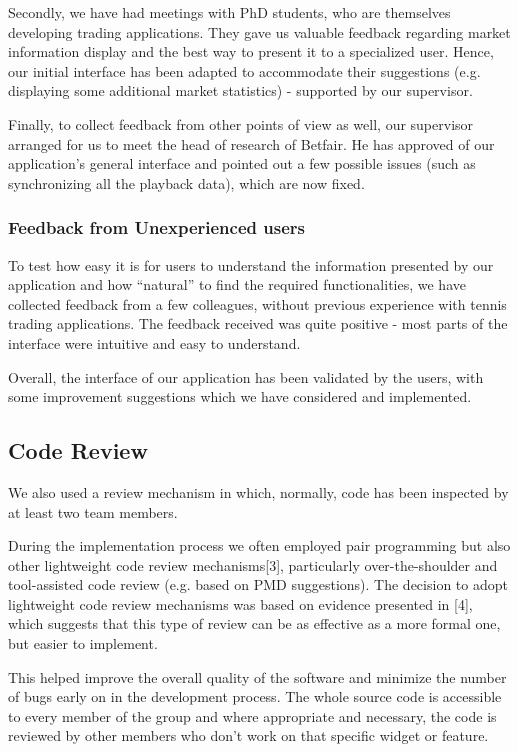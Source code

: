 \documentclass[10pt]{article}
\begin{document}
Secondly, we have had meetings with PhD students, who are themselves developing trading applications. They gave us valuable feedback regarding market information display and the best way to present it to a specialized user. Hence, our initial interface has been adapted to accommodate their suggestions (e.g. displaying some additional market statistics) - supported by our supervisor.

Finally, to collect feedback from other points of view as well, our supervisor arranged for us to meet the head of research of Betfair. He has approved of our application's general interface and pointed out a few possible issues (such as synchronizing all the playback data), which are now fixed.

\subsubsection{Feedback from Unexperienced users}

To test how easy it is for users to understand the information presented by our application and how ``natural'' to find the required functionalities, we have collected feedback from a few colleagues, without previous experience with tennis trading applications. The feedback received was quite positive - most parts of the interface were intuitive and easy to understand.

Overall, the interface of our application has been validated by the users, with some improvement suggestions which we have considered and implemented.


\subsection{Code Review}

We also used a review mechanism in which, normally, code has been inspected by at least two team members.

During the implementation process we often employed pair programming but also other lightweight code review mechanisms[3], particularly over-the-shoulder and tool-assisted code review (e.g. based on PMD suggestions).
The decision to adopt lightweight code review mechanisms was based on evidence presented in [4], which suggests that this type of review can be as effective as a more formal one, but easier to implement.

This helped improve the overall quality of the software and minimize the number of bugs early on in the development process.
The whole source code is accessible to every member of the group and where appropriate and necessary, the code is reviewed by other members who don’t work on that specific widget or feature. 
\end{document}
